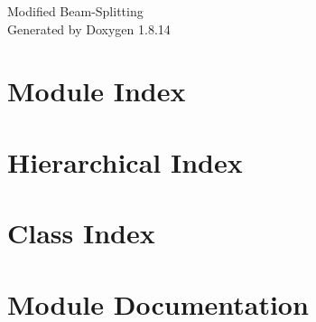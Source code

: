 \documentclass[twoside]{book}
\newcommand{\+}{\discretionary{\mbox{\scriptsize$\hookleftarrow$}}{}{}}
\newcommand{\clearemptydoublepage}{%
  \newpage{\pagestyle{empty}\cleardoublepage}%
}
\begin{document}
\hypersetup{pageanchor=false,
             bookmarksnumbered=true,
             pdfencoding=unicode
            }
\begin{titlepage}
\vspace*{7cm}
\begin{center}%
{\Large Modified Beam-\/\+Splitting }\\
\vspace*{1cm}
{\large Generated by Doxygen 1.8.14}\\
\end{center}
\end{titlepage}
\clearemptydoublepage
{}
\tableofcontents
\clearemptydoublepage
{}
\hypersetup{pageanchor=true}

\chapter{Module Index}

\chapter{Hierarchical Index}

\chapter{Class Index}

\chapter{Module Documentation}



\end{document}

